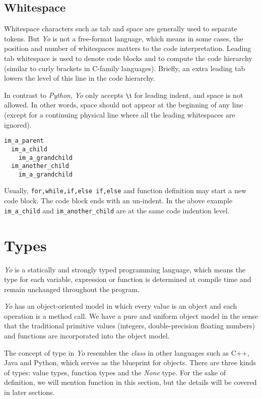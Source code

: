 \documentclass[11pt]{article}
\begin{document}
\subsection{Whitespace} %
Whitespace characters such as tab and space are generally used to separate tokens. But \textit{Yo} is not a free-format language, which means in some cases, the position and number of whitespaces matters to the code interpretation. Leading tab whitespace is used to denote code blocks and to compute the code hierarchy (similar to curly brackets in C-family languages). Briefly, an extra leading tab lowers the level of this line in the code hierarchy.%

In contrast to \textit{Python}, \textit{Yo} only accepts \texttt{\textbackslash}t for leading indent, and space is not allowed. In other words, space should not appear at the beginning of any line (except for a continuing physical line where all the leading whitespaces are ignored).\\
\begin{lstlisting}
im_a_parent
  im_a_child
    im_a_grandchild
  im_another_child
    im_a_grandchild
\end{lstlisting}

Usually, \texttt{for,while,if,else if,else} and function definition may start a new code block. The code block ends with an un-indent. In the above example \texttt{im\_a\_child} and \texttt{im\_another\_child} are at the same code indention level.


\section{Types}
\textit{Yo} is a statically and strongly typed programming language, which means the type for each variable, expression or function is determined at compile time and remain unchanged throughout the program.

\textit{Yo} has an object-oriented model in which every value is an object and each operation is a method call. We have a pure and uniform object model in the sense that the traditional primitive values (integers, double-precision floating numbers) and functions are incorporated into the object model.

The concept of type in \textit{Yo} resembles the \textit{class} in other languages such as C++, Java and Python, which serves as the blueprint for objects. There are three kinds of types: value types, function types and the \textit{None} type. For the sake of definition, we will mention function in this section, but the details will be covered in later sections.
\end{document}
